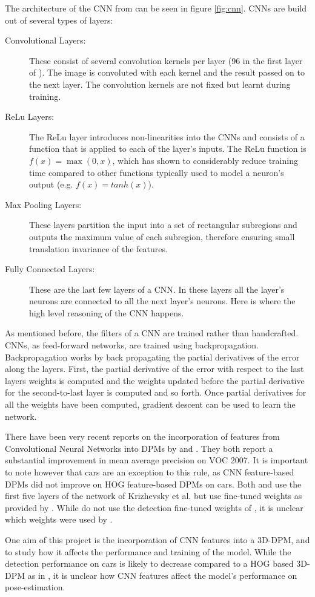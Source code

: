 The architecture of the CNN from \cite{krizhevsky2012imagenet} can be seen in figure \ref{fig:cnn}. CNNs are build out of several types of layers: 
\begin{description}
\item[Convolutional Layers:]  
These consist of several convolution kernels per layer (96 in the first layer of \cite{krizhevsky2012imagenet}). The image is convoluted with each kernel and the result passed on to the next layer. The convolution kernels are not fixed but learnt during training. 
\item[ReLu Layers:]  
The ReLu layer introduces non-linearities into the CNNs and consists of a function that is applied to each of the layer's inputs. The ReLu function is $f(x)=\max(0,x)$, which has shown to considerably reduce training time compared to other functions typically used to model a neuron's output (e.g. $f(x)=tanh(x)$).
\item[Max Pooling Layers:]  These layers partition the input into a set of rectangular subregions and outputs the maximum value of each  subregion, therefore ensuring small translation invariance of the features.
\item[Fully Connected Layers:] These are the last few layers of a CNN. In these layers all the layer's neurons are connected  to all the next layer's neurons. Here is where the high level reasoning of the CNN happens. 
\end{description}

As mentioned before, the filters of a CNN are trained rather than handcrafted. CNNs, as feed-forward networks, are trained  using  backpropagation. Backpropagation works by  back propagating the partial derivatives of the error along the layers. First, the partial derivative of the error with respect to the last layers weights  is computed and the weights updated before the partial derivative for the second-to-last layer is computed and so forth. Once partial derivatives for all the weights have been computed, gradient descent can be used to learn the network. 

There have been very recent reports on the incorporation of  features from Convolutional Neural Networks into DPMs by \cite{girshick2014deformable} and \cite{savalle8deformable}. They both report a substantial improvement in mean average precision on VOC 2007. It is important to note however that cars are an exception to this rule, as CNN feature-based DPMs did not improve on HOG feature-based DPMs on cars. Both \cite{girshick2014deformable} and \cite{savalle8deformable} use the first five layers of the network of Krizhevsky et al.  \cite{krizhevsky2012imagenet} but use fine-tuned weights as provided by \cite{girshick2013rich}. While \cite{girshick2014deformable} do not use the detection fine-tuned weights of \cite{girshick2013rich}, it is unclear which weights were used by  \cite{savalle8deformable}. 

One aim of this project is the incorporation of CNN features into a 3D-DPM, and to study how it affects the performance and training of the model. While the detection performance on cars is likely to decrease compared  to a HOG based 3D-DPM as in \cite{girshick2014deformable}, it is unclear how CNN features affect the model's performance on pose-estimation.